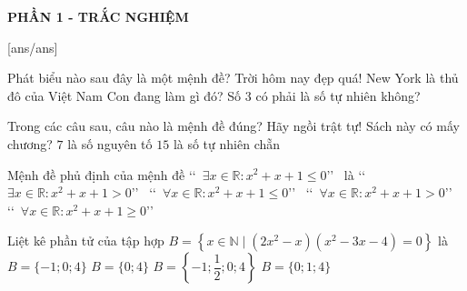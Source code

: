 
\begin{center}
	\textbf{PHẦN 1 - TRẮC NGHIỆM}
\end{center}
[ans/ans]
\begin{ex}%
	Phát biểu nào sau đây là một mệnh đề?
	\choice
	{Trời hôm nay đẹp quá!}
	{\True New York là thủ đô của Việt Nam}
	{Con đang làm gì đó?}
	{Số $ 3 $ có phải là số tự nhiên không?}
\end{ex}

\begin{ex}%
	Trong các câu sau, câu nào là mệnh đề đúng?
	\choice
	{Hãy ngồi trật tự!}
	{Sách này có mấy chương?}
	{\True $ 7 $ là số nguyên tố}
	{$ 15 $ là số tự nhiên chẵn}
\end{ex}

\begin{ex}%
	Mệnh đề phủ định của mệnh đề  \lq\lq~$\exists x \in \mathbb{R}\colon x^2+x+1 \leq 0$\rq\rq~ là
	\choice
	{\lq\lq~$\exists x \in \mathbb{R}\colon x^2+x+1>0$\rq\rq~}
	{\lq\lq~$\forall x \in \mathbb{R}\colon x^2+x+1 \leq 0$\rq\rq~}
	{\True \lq\lq~$\forall x \in \mathbb{R}\colon x^2+x+1>0$\rq\rq~}
	{\lq\lq~$\forall x \in \mathbb{R}\colon x^2+x+1 \geq 0$\rq\rq~}
\end{ex}

\begin{ex}%
	Liệt kê phần tử của tập hợp $B=\left\{x \in \mathbb{N}\mid\left(2 x^2-x\right)\left(x^2-3 x-4\right)=0\right\}$ là
	\choice
	{$B=\{-1 ; 0 ; 4\}$}
	{\True $B=\{0 ; 4\}$}
	{$B=\left\{-1 ; \dfrac{1}{2}; 0 ; 4\right\}$}
	{$B=\{0 ; 1 ; 4\}$}
\end{ex}

